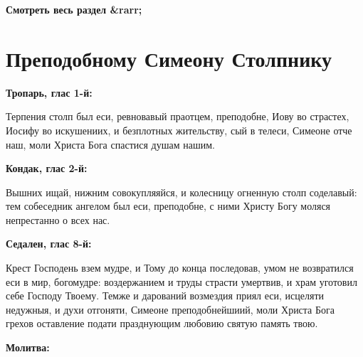 \mychapterending


\bfseries Смотреть весь раздел &rarr;\normalfont{} 

\section{Преподобному Симеону Столпнику}
 


\bfseries Тропарь, глас 1-й:\normalfont{}


Терпения столп был еси, ревновавый праотцем, преподобне, Иову во страстех, Иосифу во искушениих, и безплотных жительству, сый в телеси, Симеоне отче наш, моли Христа Бога спастися душам нашим. 


\medskip


\bfseries Кондак, глас 2-й:\normalfont{}


Вышних ищай, нижним совокупляяйся, и колесницу огненную столп соделавый: тем собеседник ангелом был еси, преподобне, с ними Христу Богу моляся непрестанно о всех нас.


\medskip


\bfseries Седален, глас 8-й:\normalfont{}


Крест Господень взем мудре, и Тому до конца последовав, умом не возвратился еси в мир, богомудре: воздержанием и труды страсти умертвив, и храм уготовил себе Господу Твоему. Темже и дарований возмездия приял еси, исцеляти недужныя, и духи отгоняти, Симеоне преподобнейшиий, моли Христа Бога грехов оставление подати празднующим любовию святую память твою.


\medskip


\bfseries Молитва:\normalfont{}


